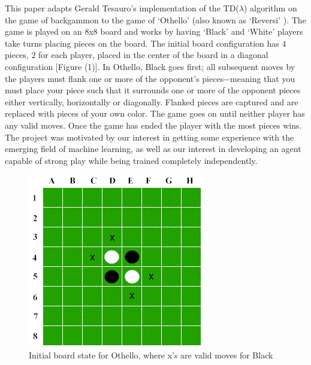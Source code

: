 \documentclass{sig-alternate-05-2015}
\begin{document}
This paper adapts Gerald Tesauro's implementation of the TD(\(\lambda\)) algorithm on the game of backgammon to the game of `Othello' (also known as `Reversi' ). The game is played on an 8x8 board and works by having `Black' and `White' players take turns placing pieces on the board. The initial board configuration has $4$ pieces, $2$ for each player, placed in the center of the board in a diagonal configuration [Figure (1)]. In Othello, Black goes first; all subsequent moves by the players  must flank one or more of the opponent's pieces$-$meaning that you must place your piece such that it surrounds one or more of the opponent pieces either vertically, horizontally or diagonally. Flanked pieces are captured and are replaced with pieces of your own color. The game goes on until neither player has any valid moves. Once the game has ended the player with the most pieces wins. The project was motivated by our interest in getting some experience with the emerging field of machine learning, as well as our interest in developing an agent capable of strong play while being trained completely independently. 

\begin{figure}[h!]
  \includegraphics[width=\linewidth]{stboard.png}
  \caption{Initial board state for Othello, where x's are valid moves for Black}
  \label{fig:board1}
\end{figure}
\end{document}
